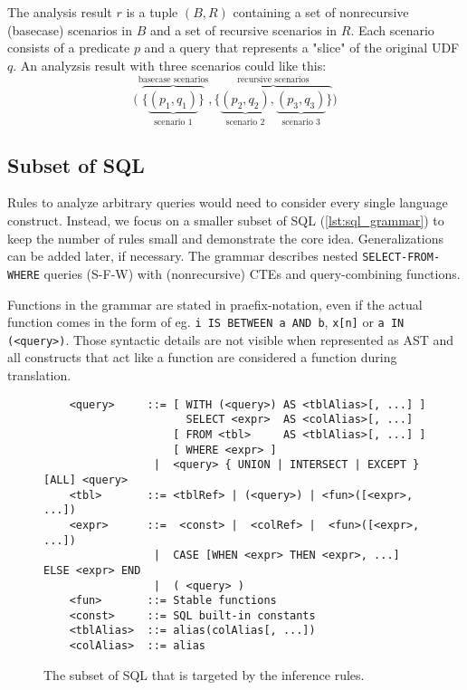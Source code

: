 The analysis result $r$ is a tuple $(B, R)$ containing a set of nonrecursive (basecase) scenarios in $B$ and a set of recursive scenarios in $R$. Each scenario consists of a predicate $p$ and a query that represents a "slice" of the original UDF $q$. An analyzsis result with three scenarios could like this:
$$
\Big(
    \overbrace{\big\{
        \underbrace{
            (p_1, q_1)
        }_{\text{scenario 1}}
    \big\}}^{\text{basecase scenarios}}
    ,
    \overbrace{\big\{
        \underbrace{
            (p_2, q_2)
        }_{\text{scenario 2}},
        \underbrace{
            (p_3, q_3)
        }_{\text{scenario 3}}
    \big\}}^{\text{recursive scenarios}}
\Big)
$$

\subsection{Subset of SQL}
Rules to analyze arbitrary queries would need to consider every single language construct. Instead, we focus on a smaller subset of SQL (\autoref{lst:sql_grammar}) to keep the number of rules small and demonstrate the core idea. Generalizations can be added later, if necessary. The grammar describes nested \texttt{SELECT-FROM-WHERE} queries (S-F-W) with (nonrecursive) CTEs and query-combining functions.

Functions in the grammar are stated in praefix-notation, even if the actual function comes in the form of eg. \texttt{i IS BETWEEN a AND b}, \texttt{x[n]} or \texttt{a IN (<query>)}. Those syntactic details are not visible when represented as AST and all constructs that act like a function are considered a function during translation.

\begin{figure}[H]
    \begin{verbatim}
    <query>     ::= [ WITH (<query>) AS <tblAlias>[, ...] ]
                      SELECT <expr>  AS <colAlias>[, ...]
                    [ FROM <tbl>     AS <tblAlias>[, ...] ]
                    [ WHERE <expr> ]
                 |  <query> { UNION | INTERSECT | EXCEPT } [ALL] <query>
    <tbl>       ::= <tblRef> | (<query>) | <fun>([<expr>, ...])
    <expr>      ::=  <const> |  <colRef> |  <fun>([<expr>, ...])
                 |  CASE [WHEN <expr> THEN <expr>, ...] ELSE <expr> END
                 |  ( <query> )
    <fun>       ::= Stable functions
    <const>     ::= SQL built-in constants
    <tblAlias>  ::= alias(colAlias[, ...])
    <colAlias>  ::= alias
    \end{verbatim}
    \caption{The subset of SQL that is targeted by the inference rules.}
    \label{lst:sql_grammar}
\end{figure}


